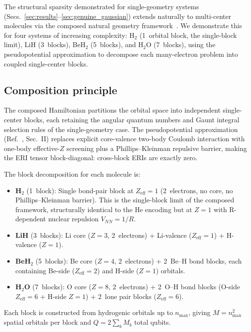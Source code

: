 \documentclass[aps,pra,twocolumn,superscriptaddress,longbibliography]{revtex4-2}
\begin{document}
The structural sparsity demonstrated for single-geometry systems
(Secs.~\ref{sec:results}--\ref{sec:genuine_gaussian}) extends naturally
to multi-center molecules via the composed natural geometry
framework~\cite{loutey_paper17}.  We demonstrate this for four
systems of increasing complexity: H$_2$ (1~orbital block, the
single-block limit), LiH (3~blocks), BeH$_2$ (5~blocks), and H$_2$O
(7~blocks), using the pseudopotential approximation to decompose each
many-electron problem into coupled single-center blocks.


\subsection{Composition principle}
\label{sec:composition_principle}

The composed Hamiltonian partitions the orbital space into independent
single-center blocks, each retaining the angular quantum numbers and
Gaunt integral selection rules of the single-geometry case.  The
pseudopotential approximation (Ref.~\cite{loutey_paper17}, Sec.~II)
replaces explicit core-valence two-body Coulomb interaction with
one-body effective-$Z$ screening plus a Phillips--Kleinman repulsive
barrier, making the ERI tensor block-diagonal: cross-block ERIs are
exactly zero.

The block decomposition for each molecule is:
\begin{itemize}
\item \textbf{H$_2$} (1~block): Single bond-pair block at $Z_{\mathrm{eff}} = 1$
  (2~electrons, no core, no Phillips--Kleinman barrier).  This is the
  single-block limit of the composed framework, structurally identical
  to the He encoding but at $Z = 1$ with R-dependent nuclear repulsion
  $V_{NN} = 1/R$.
\item \textbf{LiH} (3~blocks): Li core ($Z = 3$, 2~electrons) +
  Li-valence ($Z_{\mathrm{eff}} = 1$) + H-valence ($Z = 1$).
\item \textbf{BeH$_2$} (5~blocks): Be core ($Z = 4$, 2~electrons) +
  2~Be--H bond blocks, each containing Be-side
  ($Z_{\mathrm{eff}} = 2$) and H-side ($Z = 1$) orbitals.
\item \textbf{H$_2$O} (7~blocks): O core ($Z = 8$, 2~electrons) +
  2~O--H bond blocks (O-side $Z_{\mathrm{eff}} = 6$ + H-side
  $Z = 1$) + 2~lone pair blocks ($Z_{\mathrm{eff}} = 6$).
\end{itemize}
Each block is constructed from hydrogenic orbitals up to
$n_{\max}$, giving $M = n_{\max}^2$ spatial orbitals per block and
$Q = 2 \sum_b M_b$ total qubits.
\end{document}
